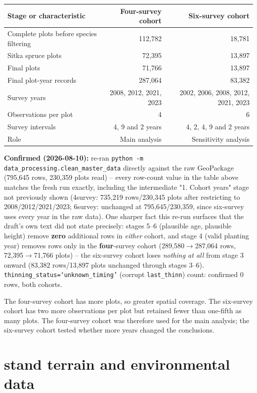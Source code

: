 \begin{table}[h]
\centering
\begin{tabular}{lrr}
\hline
Stage or characteristic & Four-survey cohort & Six-survey cohort \\
\hline
Complete plots before species filtering & 112,782 & 18,781 \\
Sitka spruce plots & 72,395 & 13,897 \\
Final plots & 71,766 & 13,897 \\
Final plot-year records & 287,064 & 83,382 \\
Survey years & 2008, 2012, 2021, 2023 & 2002, 2006, 2008, 2012, 2021, 2023 \\
Observations per plot & 4 & 6 \\
Survey intervals & 4, 9 and 2 years & 4, 2, 4, 9 and 2 years \\
Role & Main analysis & Sensitivity analysis \\
\hline
\end{tabular}
\end{table}
\textbf{Confirmed (2026-08-10):} re-ran \texttt{python -m data\_processing.clean\_master\_data} directly against the raw GeoPackage (795,645 rows, 230,359 plots read) -- every row-count value in the table above matches the fresh run exactly, including the intermediate "1. Cohort years" stage not previously shown (4survey: 735,219 rows/230,345 plots after restricting to 2008/2012/2021/2023; 6survey: unchanged at 795,645/230,359, since six-survey uses every year in the raw data). One sharper fact this re-run surfaces that the draft's own text did not state precisely: stages 5--6 (plausible age, plausible height) remove \textbf{zero} additional rows in \emph{either} cohort, and stage 4 (valid planting year) removes rows only in the \textbf{four}-survey cohort (289,580$\to$287,064 rows, 72,395$\to$71,766 plots) -- the six-survey cohort loses \emph{nothing at all} from stage 3 onward (83,382 rows/13,897 plots unchanged through stages 3--6). \texttt{thinning\_status=`unknown\_timing'} (corrupt \texttt{last\_thinn}) count: confirmed 0 rows, both cohorts.

The four-survey cohort has more plots, so greater spatial coverage.
The six-survey cohort has two more observations per plot but retained fewer than one-fifth as many plots.
The four-survey cohort was therefore used for the main analysis; the six-survey cohort tested whether more years changed the conclusions.

\section{stand terrain and environmental data}
